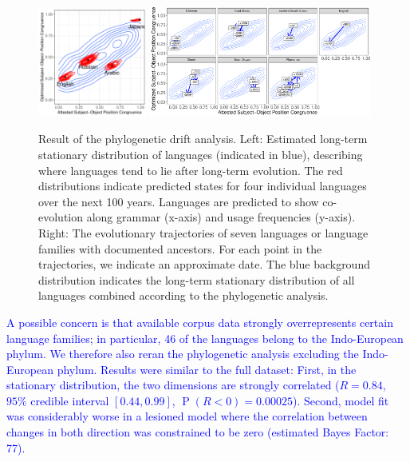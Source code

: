 \documentclass[9pt,twocolumn,twoside,lineno]{pnas-new}
\begin{document}
\begin{figure}
    \includegraphics[width=0.32\textwidth]{../change/visualize/stationary.pdf}
    \includegraphics[width=0.65\textwidth]{../analysis/figures/historical_2.6_times_stationary_layout.pdf}
    \caption{Result of the phylogenetic drift analysis.
	Left: Estimated long-term stationary distribution of languages (indicated in blue), describing where languages tend to lie after long-term evolution.
    The red distributions indicate predicted states for four individual languages over the next 100 years. Languages are predicted to show co-evolution along grammar (x-axis)  and usage frequencies (y-axis).	    
Right: The evolutionary trajectories of seven languages or language families with documented ancestors. For each point in the trajectories, we indicate an approximate date. The blue background distribution indicates the long-term stationary distribution of all languages combined according to the phylogenetic analysis. }
    \label{fig:historical}\label{fig:drift-model}
\end{figure}


\textcolor{blue}{A possible concern is that available corpus data strongly overrepresents certain language families; in particular, 46 of the languages belong to the Indo-European phylum.
We therefore also reran the phylogenetic analysis excluding the Indo-European phylum.
Results were similar to the full dataset:
First, in the stationary distribution, the two dimensions are strongly correlated ($R=0.84$, $95\%$ credible interval $[0.44, 0.99]$, $\operatorname{P}(R<0) = 0.00025$). %
Second, model fit was considerably worse in a lesioned model where the correlation between changes in both direction was constrained to be zero (estimated Bayes Factor: 77).} 
\end{document}
